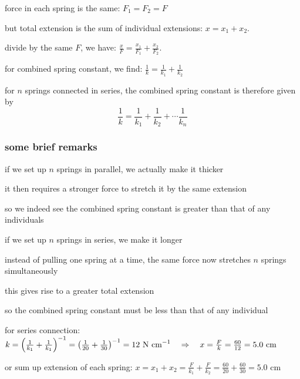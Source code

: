 force in each spring is the same: $F_1=F_2=F$

but total extension is the sum of individual extensions: $x=x_1+x_2$.

divide by the same $F$, we have: $\frac{x}{F} = \frac{x_1}{F_1} + \frac{x_2}{F_2}$.

for combined spring constant, we find: $\frac{1}{k} = \frac{1}{k_1} + \frac{1}{k_2}$

for $n$ springs connected in series, the combined spring constant is therefore given by
\begin{equation*}
\boxed{\frac{1}{k} = \frac{1}{k_1} + \frac{1}{k_2} + \cdots \frac{1}{k_n}}
\end{equation*}

\subsubsection*{some brief remarks}

\cmt if we set up $n$ springs in parallel, we actually make it thicker

it then requires a stronger force to stretch it by the same extension

so we indeed see the combined spring constant is greater than that of any individuals

\cmt if we set up $n$ springs in series, we make it longer

instead of pulling one spring at a time, the same force now stretches $n$ springs simultaneously

this gives rise to a greater total extension

so the combined spring constant must be less than that of any individual


\sol for series connection: $k = \left(\frac{1}{k_1} + \frac{1}{k_1}\right)^{-1} = \left( \frac{1}{20} + \frac{1}{30} \right)^{-1} = 12 \text{ N cm}^{-1} \quad \Rightarrow \quad x = \frac{F}{k} = \frac{60}{12} = 5.0 \text{ cm}$

\eqskip or sum up extension of each spring: $x = x_1 + x_2 = \frac{F}{k_1} + \frac{F}{k_2} = \frac{60}{20} + \frac{60}{30} = 5.0 \text{ cm}$

